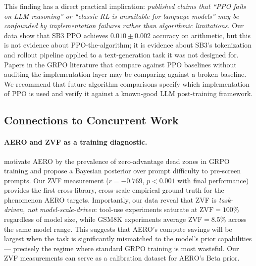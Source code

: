 \documentclass{article}
\begin{document}
This finding has a direct practical implication: \emph{published claims that
``PPO fails on LLM reasoning'' or ``classic RL is unsuitable for language models''
may be confounded by implementation failures rather than algorithmic limitations}.
Our data show that SB3 PPO achieves $0.010 \pm 0.002$ accuracy on arithmetic,
but this is not evidence about PPO-the-algorithm; it is evidence about
SB3's tokenization and rollout pipeline applied to a text-generation task it
was not designed for.
Papers in the GRPO literature that compare against PPO baselines without
auditing the implementation layer may be comparing against a broken baseline.
We recommend that future algorithm comparisons specify which implementation of
PPO is used and verify it against a known-good LLM post-training framework.

\subsection{Connections to Concurrent Work}
\label{sec:discuss_related}

\paragraph{AERO and ZVF as a training diagnostic.}
\citet{zhang2026aero} motivate AERO by the prevalence of zero-advantage dead
zones in GRPO training and propose a Bayesian posterior over prompt difficulty
to pre-screen prompts.
Our ZVF measurement ($r = -0.769$, $p < 0.001$ with final performance) provides
the first cross-library, cross-scale empirical ground truth for the phenomenon
AERO targets.
Importantly, our data reveal that ZVF is \emph{task-driven, not model-scale-driven}:
tool-use experiments saturate at $\text{ZVF} = 100\%$ regardless of model size,
while GSM8K experiments average $\text{ZVF} = 8.5\%$ across the same model
range.
This suggests that AERO's compute savings will be largest when the task is
significantly mismatched to the model's prior capabilities --- precisely the
regime where standard GRPO training is most wasteful.
Our ZVF measurements can serve as a calibration dataset for AERO's Beta prior.
\end{document}
